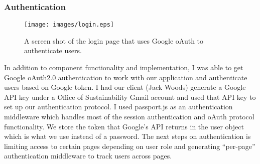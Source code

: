 \documentclass[letterpaper,10pt,serif,draftclsnofoot,onecolumn,compsoc,titlepage]{IEEEtran}
\begin{document}
\noindent 
\subsubsection{Authentication}
\begin{figure}[H]
  \centering
  \texttt{[image: images/login.eps]}
  \caption{A screen shot of the login page that uses Google oAuth to authenticate users.}
\end{figure}
In addition to component functionality and implementation, I was able to get Google oAuth2.0 authentication to work with our application and authenticate users based on Google token. I had our client (Jack Woods) generate a Google API key under a Office of Sustainability Gmail account and used that API key to set up our authentication protocol. I used passport.js as an authentication middleware which handles most of the session authentication and oAuth protocol functionality. We store the token that Google's API returns in the user object which is what we use instead of a password. The next steps on authentication is limiting access to certain pages depending on user role and generating ``per-page'' authentication middleware to track users across pages.
\end{document}
